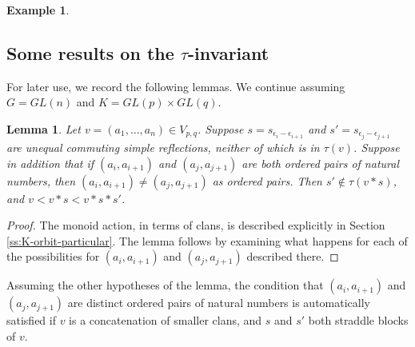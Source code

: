 \documentclass[11pt,letterpaper,reqno]{amsart}
\numberwithin{equation}{section}
\theoremstyle{plain}
\newtheorem{lemma}[theorem]{Lemma}
\theoremstyle{definition}
\newtheorem{example}[theorem]{Example}
\theoremstyle{remark}
\begin{document}
\begin{example}
\begin{figure}[H]
\label{Fig1}
\end{figure}
\end{example}


\subsection{Some results on the $\tau$-invariant} \label{ss:tau}
For later use, we record the following lemmas.  We continue assuming $G = GL(n)$ and $K = GL(p) \times GL(q)$.

\begin{lemma} \label{l:tau1} Let $v = (a_1, \ldots, a_n) \in V_{p,q}$.  Suppose $s = s_{\epsilon_i - \epsilon_{i+1}}$ and $s' = s_{\epsilon_j - \epsilon_{j+1}}$ are unequal commuting 
simple reflections, neither of which is in $\tau(v)$.  Suppose in addition that 
if $(a_i, a_{i+1})$ and $(a_j, a_{j+1})$ are both ordered pairs of natural numbers, then
$(a_i, a_{i+1}) \neq (a_j, a_{j+1})$ as ordered pairs.
Then $s' \not\in \tau(v*s)$, and $v < v*s < v* s *s'$.  
\end{lemma}

\begin{proof} The monoid action, in terms of clans, is described explicitly in Section \ref{ss:K-orbit-particular}.  The lemma follows by
examining what happens for each of the possibilities for $(a_i, a_{i+1})$ and $(a_j, a_{j+1})$ described there.
\end{proof}

Assuming the other hypotheses of the lemma, the condition that $(a_i, a_{i+1})$ and $(a_j, a_{j+1})$ are distinct ordered pairs of natural numbers is automatically
satisfied if $v$ is a concatenation of smaller clans, and $s$ and $s'$ both straddle blocks of $v$.
\end{document}
